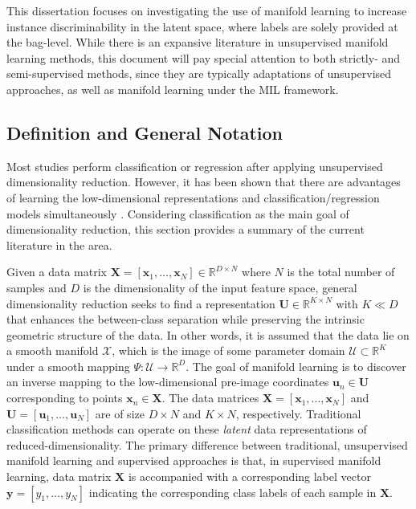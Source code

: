 This dissertation focuses on investigating the use of manifold learning to increase instance discriminability in the latent space, where labels are solely provided at the bag-level.   While there is an expansive literature in unsupervised manifold learning methods, this document will pay special attention to both strictly- and semi-supervised methods, since they are typically adaptations of unsupervised approaches, as well as manifold learning under the MIL framework.

\subsection{Definition and General Notation}
Most studies perform classification or regression after applying unsupervised dimensionality reduction.  However, it has been shown that there are advantages of learning the low-dimensional representations and classification/regression models simultaneously \cite{Chao2019RecentAdvancesSupervisedDimRed,Rish2008SupDimRedGLM}.  Considering classification as the main goal of dimensionality reduction, this section provides a summary of the current literature in the area. \newline

Given a data matrix $\bm{X} = [\bm{x}_1, \dots, \bm{x}_N]\in \mathbb{R}^{D \times N}$ where $N$ is the total number of samples and $D$ is the dimensionality of the input feature space, general dimensionality reduction seeks to find a representation $\bm{U} \in \mathbb{R}^{K \times N}$ with $K \ll D$ that enhances the between-class separation while preserving the intrinsic geometric structure of the data\cite{Vural2018StudySupervisedManifoldLearning}.  In other words, it is assumed that the data lie on a smooth manifold $\mathcal{X}$, which is the image of some parameter domain $\mathcal{U} \subset \mathbb{R}^{K}$ under a smooth mapping $\Psi : \mathcal{U} \rightarrow \mathbb{R}^{D}$.  The goal of manifold learning is to discover an inverse mapping to the low-dimensional pre-image coordinates $\bm{u}_n \in \bm{U}$ corresponding to points $\bm{x}_n \in \bm{X}$.  The data matrices $\bm{X} = [\bm{x}_1, \dots, \bm{x}_N]$ and $\bm{U} = [\bm{u}_1, \dots, \bm{u}_N]$  are of size $D \times N$ and $K \times N$, respectively.  Traditional classification methods can operate on these \textit{latent} data representations of reduced-dimensionality. The primary difference between traditional, unsupervised manifold learning and supervised approaches is that, in supervised manifold learning, data matrix $\bm{X} $ is accompanied with a corresponding label vector $\bm{y} = [y_1, \dots, y_N]$ indicating the corresponding class labels of each sample in $\bm{X}$. \newline

